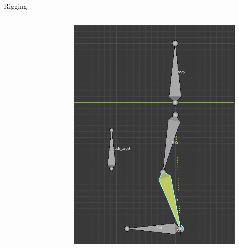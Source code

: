 \documentclass[10pt]{beamer}
\begin{document}
\begin{frame}{Rigging}
\begin{columns}[T,onlytextwidth]
\begin{figure}
    \end{figure}
    \begin{figure}
      \includegraphics[width=.9\linewidth]{figures/leg}
    \end{figure}
  \end{columns}
\end{frame}
\end{document}
